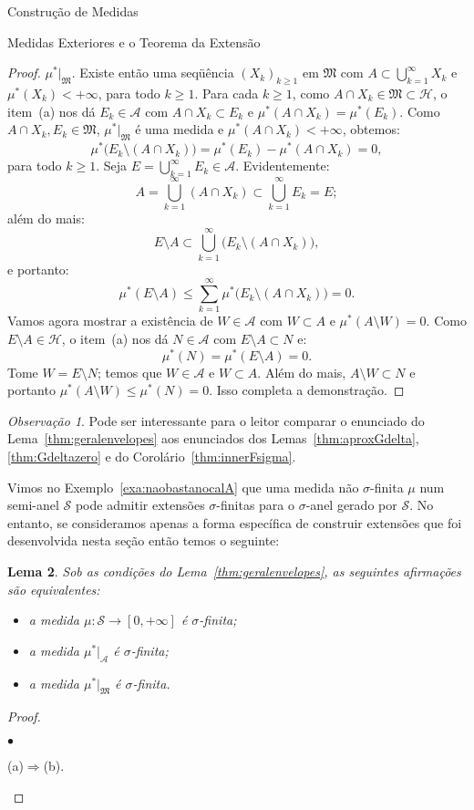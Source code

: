 \documentclass[oneside,final,11pt]{amsbook}
\newcounter{contador}
\newenvironment{bulletindent}{\setcounter{contador}{0}
\begin{list} {$\bullet$}
{\usecounter{contador}
\setlength{\leftmargin}{10pt}
\setlength{\rightmargin}{10pt}
\setlength{\labelsep}{5pt}
\setlength{\itemsep}{10pt}
\setlength{\topsep}{10pt}}}
{\end{list}}
\theoremstyle{remark}\newtheorem{exercise}{Exercício}[chapter]
\theoremstyle{remark}\newtheorem{*exercise}[exercise]{\hbox to 0pt{\hskip 0pt minus 1fil*}Exercício}
\theoremstyle{definition}\newtheorem{exdefin}{Definição}[chapter]
\theoremstyle{plain}\newtheorem{teo}{Teorema}[section]
\theoremstyle{plain}\newtheorem{lem}[teo]{Lema}
\theoremstyle{plain}\newtheorem{prop}[teo]{Proposição}
\theoremstyle{plain}\newtheorem{cor}[teo]{Corolário}
\theoremstyle{definition}\newtheorem{defin}[teo]{Definição}
\theoremstyle{remark}\newtheorem{rem}[teo]{Observação}
\theoremstyle{definition}\newtheorem{notation}[teo]{Notação}
\theoremstyle{definition}\newtheorem{convention}[teo]{Convenção}
\theoremstyle{definition}\newtheorem{example}[teo]{Exemplo}
\numberwithin{section}{chapter}
\numberwithin{equation}{section}
\begin{document}
\begin{chapter}{Construção de Medidas}
\begin{section}{Medidas Exteriores e o Teorema da Extensão}
\begin{proof}
$\mu^*\vert_{\mathfrak M}$. Existe então uma seqüência $(X_k)_{k\ge1}$ em $\mathfrak M$
com $A\subset\bigcup_{k=1}^\infty X_k$ e $\mu^*(X_k)<+\infty$, para todo $k\ge1$.
Para cada $k\ge1$, como $A\cap X_k\in\mathfrak M\subset\mathcal H$, o item~(a) nos dá
$E_k\in\mathcal A$ com $A\cap X_k\subset E_k$ e $\mu^*(A\cap X_k)=\mu^*(E_k)$.
Como $A\cap X_k,E_k\in\mathfrak M$, $\mu^*\vert_{\mathfrak M}$ é uma medida
e $\mu^*(A\cap X_k)<+\infty$, obtemos:
\[\mu^*\big(E_k\setminus(A\cap X_k)\big)=\mu^*(E_k)-\mu^*(A\cap X_k)=0,\]
para todo $k\ge1$. Seja $E=\bigcup_{k=1}^\infty E_k\in\mathcal A$. Evidentemente:
\[A=\bigcup_{k=1}^\infty(A\cap X_k)\subset\bigcup_{k=1}^\infty E_k=E;\]
além do mais:
\[E\setminus A\subset\bigcup_{k=1}^\infty\big(E_k\setminus(A\cap X_k)\big),\]
e portanto:
\[\mu^*(E\setminus A)\le\sum_{k=1}^\infty\mu^*\big(E_k\setminus(A\cap X_k)\big)=0.\]
Vamos agora mostrar a existência de $W\in\mathcal A$ com $W\subset A$ e $\mu^*(A\setminus W)=0$.
Como $E\setminus A\in\mathcal H$, o item~(a) nos dá $N\in\mathcal A$ com
$E\setminus A\subset N$ e:
\[\mu^*(N)=\mu^*(E\setminus A)=0.\]
Tome $W=E\setminus N$; temos que $W\in\mathcal A$ e $W\subset A$. Além do mais, $A\setminus W\subset N$
e portanto $\mu^*(A\setminus W)\le\mu^*(N)=0$. Isso completa a demonstração.
\end{proof}

\begin{rem}
Pode ser interessante para o leitor comparar o enunciado do Lema~\ref{thm:geralenvelopes} aos enunciados
dos Lemas~\ref{thm:aproxGdelta}, \ref{thm:Gdeltazero} e do Corolário~\ref{thm:innerFsigma}.
\end{rem}

Vimos no Exemplo~\ref{exa:naobastanocalA} que uma medida não $\sigma$-finita
$\mu$ num semi-anel $\mathcal S$ pode admitir extensões $\sigma$-finitas para o $\sigma$-anel
gerado por $\mathcal S$. No entanto, se consideramos apenas a forma específica de construir extensões
que foi desenvolvida nesta seção então temos o seguinte:
\begin{lem}\label{thm:sigmatudoigual}
Sob as condições do Lema~\ref{thm:geralenvelopes}, as seguintes afirmações são equivalentes:
\begin{itemize}
\item[(a)] a medida $\mu:\mathcal S\to[0,+\infty]$ é $\sigma$-finita;
\item[(b)] a medida $\mu^*\vert_{\mathcal A}$ é $\sigma$-finita;
\item[(c)] a medida $\mu^*\vert_{\mathfrak M}$ é $\sigma$-finita.
\end{itemize}
\end{lem}
\begin{proof}\
\begin{bulletindent}
\item (a)$\Rightarrow$(b).


\end{bulletindent}
\end{proof}
\end{section}
\end{chapter}
\end{document}
